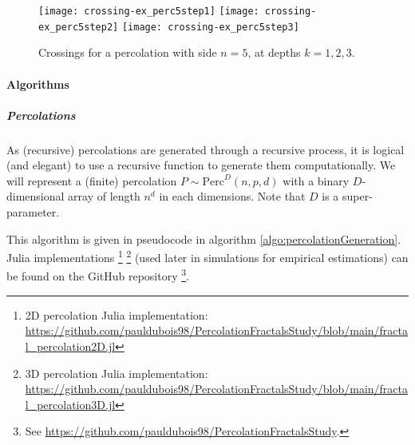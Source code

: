 \begin{figure}[!h]
	\texttt{[image: crossing-ex\_perc5step1]}
	\hspace{0.9cm}
	\texttt{[image: crossing-ex\_perc5step2]}
	\hspace{0.9cm}
	\texttt{[image: crossing-ex\_perc5step3]}
	\centering
	\caption{Crossings for a percolation with side $n=5$, at depths $k=1,2,3$.}
	\label{fig:crossingExPerc5}
\end{figure}

\paragraph{Algorithms}
\subparagraph{Percolations}
As (recursive) percolations are generated through a recursive process, it is logical (and elegant) to use a recursive function to generate them computationally.
We will represent a (finite) percolation $P \sim \text{Perc}^D(n,p,d)$ with a binary $D$-dimensional array of length $n^d$ in each dimensions.
Note that $D$ is a super-parameter.

This algorithm is given in pseudocode in algorithm \ref{algo:percolationGeneration}. Julia implementations
\footnote{2D percolation Julia implementation: \url{https://github.com/pauldubois98/PercolationFractalsStudy/blob/main/fractal\_percolation2D.jl}}
\footnote{3D percolation Julia implementation: \url{https://github.com/pauldubois98/PercolationFractalsStudy/blob/main/fractal\_percolation3D.jl}}
(used later in simulations for empirical estimations) can be found on the GitHub repository
\footnote{See \url{https://github.com/pauldubois98/PercolationFractalsStudy}.}.


